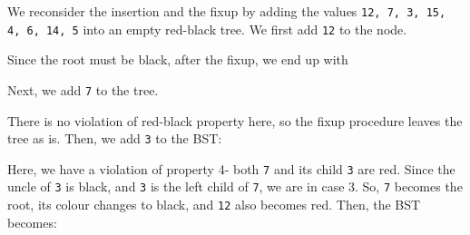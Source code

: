 \documentclass[a4paper, openany]{memoir}
\begin{document}
\noindent We reconsider the insertion and the fixup by adding the values \texttt{12, 7, 3, 15, 4, 6, 14, 5} into an empty red-black tree. We first add \texttt{12} to the node.
\begin{center}
\end{center}
Since the root must be black, after the fixup, we end up with
\begin{center}
\end{center}
Next, we add \texttt{7} to the tree.
\begin{center}
\end{center}
There is no violation of red-black property here, so the fixup procedure leaves the tree as is. Then, we add \texttt{3} to the BST:
\begin{center}
\end{center}
Here, we have a violation of property 4- both \texttt{7} and its child \texttt{3} are red. Since the uncle of \texttt{3} is black, and \texttt{3} is the left child of \texttt{7}, we are in case 3. So, \texttt{7} becomes the root, its colour changes to black, and \texttt{12} also becomes red. Then, the BST becomes:
\begin{center}
\end{center}
\end{document}
